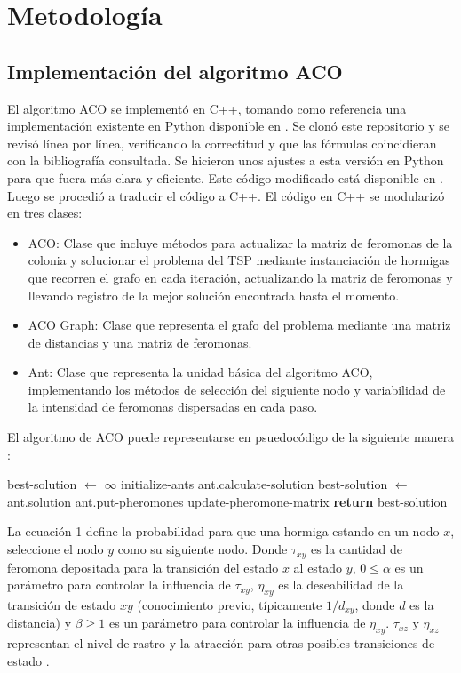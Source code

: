 \documentclass[conference]{IEEEtran}
\begin{document}
\section {Metodología}
\subsection{Implementación del algoritmo ACO}
El algoritmo ACO se implementó en C++, tomando como referencia una implementación existente en Python disponible en \cite{aco_github_1}. Se clonó este repositorio y se revisó línea por línea, verificando la correctitud y que las fórmulas coincidieran con la bibliografía consultada. Se hicieron unos ajustes a esta versión en Python para que fuera más clara y eficiente. Este código modificado está disponible en \cite{aco_github_3}. Luego se procedió a traducir el código a C++.
El código en C++ se modularizó en tres clases:
\begin{itemize}
\item ACO: Clase que incluye métodos para actualizar la matriz de feromonas de la colonia y solucionar el problema del TSP mediante instanciación de hormigas que recorren el grafo en cada iteración, actualizando la matriz de feromonas y llevando registro de la mejor solución encontrada hasta el momento.
\item ACO Graph: Clase que representa el grafo del problema mediante una matriz de distancias y una matriz de feromonas.
\item Ant: Clase que representa la unidad básica del algoritmo ACO, implementando los métodos de selección del siguiente nodo y variabilidad de la intensidad de feromonas dispersadas en cada paso.
\end{itemize}

El algoritmo de ACO puede representarse en psuedocódigo de la siguiente manera \cite{aco_wiki}:

\begin{algorithmic}[1]
\State best-solution $\gets$ $\infty$
\State initialize-ants
\State ant.calculate-solution
\State best-solution $\gets$ ant.solution
\EndIf
\State ant.put-pheromones
\EndFor
\State update-pheromone-matrix
\EndFor
\State \textbf{return} best-solution
\EndProcedure
\end{algorithmic}

La ecuación 1 define la probabilidad para que una hormiga estando en un nodo $x$, seleccione el nodo $y$ como su siguiente nodo. Donde $\tau_{xy}$ es la cantidad de feromona depositada para la transición del estado $x$ al estado $y$, $0 \leq \alpha$ es un parámetro para controlar la influencia de $\tau_{xy}$, $\eta_{xy}$ es la deseabilidad de la transición de estado $xy$ (conocimiento previo, típicamente $1/d_{xy}$, donde $d$ es la distancia) y $\beta \geq 1$ es un parámetro para controlar la influencia de $\eta_{xy}$. $\tau_{xz}$ y $\eta_{xz}$ representan el nivel de rastro y la atracción para otras posibles transiciones de estado \cite{aco_wiki}.
\end{document}
